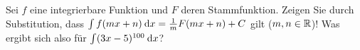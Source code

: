 \item Sei $f$ eine integrierbare Funktion und $F$ deren Stammfunktion. Zeigen Sie durch Substitution, dass $\int f(mx+n) \:\mathrm{d}{x} = \frac{1}{m} F(mx+n) + C$ gilt ($m,n\in\mathbb{R}$)! Was ergibt sich also für $\int (3x-5)^{100} \:\mathrm{d}{x}$?